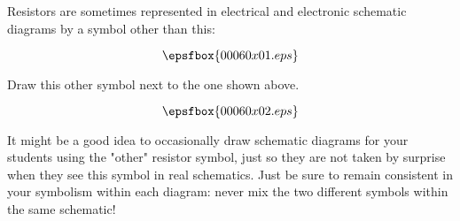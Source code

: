 

Resistors are sometimes represented in electrical and electronic schematic diagrams by a symbol other than this:

$$\epsfbox{00060x01.eps}$$

Draw this other symbol next to the one shown above.







$$\epsfbox{00060x02.eps}$$







It might be a good idea to occasionally draw schematic diagrams for your students using the "other" resistor symbol, just so they are not taken by surprise when they see this symbol in real schematics.  Just be sure to remain consistent in your symbolism within each diagram: never mix the two different symbols within the same schematic!




